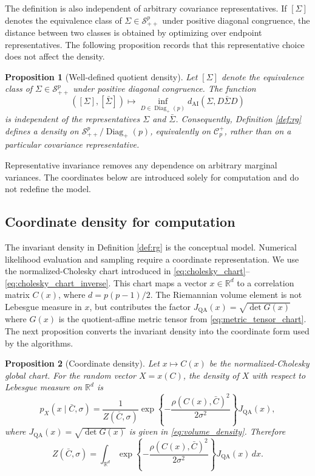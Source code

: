 \documentclass[
  12pt]{article}
\newcommand{\SPD}{\mathcal S_{++}}
\newcommand{\Corr}{\mathcal C^+}
\newcommand{\Diagp}{\operatorname{Diag}_{+}}
\newcommand{\R}{\mathbb R}
\newcommand{\QA}{\mathrm{QA}}
\newcommand{\AI}{\mathrm{AI}}
\newtheorem{proposition}{Proposition}
\begin{document}
The definition is also independent of arbitrary covariance representatives. If $[\Sigma]$ denotes the equivalence class of $\Sigma\in\SPD^p$ under positive diagonal congruence, the distance between two classes is obtained by optimizing over endpoint representatives. The following proposition records that this representative choice does not affect the density.

\begin{proposition}[Well-defined quotient density]\label{prop:well_defined}
Let $[\Sigma]$ denote the equivalence class of $\Sigma\in\SPD^p$ under positive diagonal congruence. The function
\[
([\Sigma],[\bar\Sigma])\mapsto \inf_{D\in\Diagp(p)}d_{\AI}(\Sigma,D\bar\Sigma D)
\]
is independent of the representatives $\Sigma$ and $\bar\Sigma$. Consequently, Definition \ref{def:rg} defines a density on $\SPD^p/\Diagp(p)$, equivalently on $\Corr_p$, rather than on a particular covariance representative.
\end{proposition}

Representative invariance removes any dependence on arbitrary marginal variances. The coordinates below are introduced solely for computation and do not redefine the model.



\subsection{Coordinate density for computation}

The invariant density in Definition \ref{def:rg} is the conceptual model. Numerical likelihood evaluation and sampling require a coordinate representation. We use the normalized-Cholesky chart introduced in \eqref{eq:cholesky_chart}--\eqref{eq:cholesky_chart_inverse}. This chart maps a vector $x\in\R^d$ to a correlation matrix $C(x)$, where $d=p(p-1)/2$. The Riemannian volume element is not Lebesgue measure in $x$, but contributes the factor $J_{\QA}(x)=\sqrt{\det G(x)}$ where $G(x)$ is the quotient-affine metric tensor from \eqref{eq:metric_tensor_chart}. The next proposition converts the invariant density into the coordinate form used by the algorithms.

\begin{proposition}[Coordinate density]\label{prop:coordinate_density}
Let $x\mapsto C(x)$ be the normalized-Cholesky global chart. For the random vector $X=x(C)$, the density of $X$ with respect to Lebesgue measure on $\R^d$ is
\begin{equation}\label{eq:coordinate_density}
p_X(x\mid \bar C,\sigma)=\frac{1}{Z(\bar C,\sigma)}\exp\left\{-\frac{\rho(C(x),\bar C)^2}{2\sigma^2}\right\}J_{\QA}(x),
\end{equation}
where $J_{\QA}(x)=\sqrt{\det G(x)}$ is given in \eqref{eq:volume_density}. Therefore
\begin{equation}\label{eq:chart_integral_Z}
Z(\bar C,\sigma)=\int_{\R^d}\exp\left\{-\frac{\rho(C(x),\bar C)^2}{2\sigma^2}\right\}J_{\QA}(x)\,dx.
\end{equation}
\end{proposition}
\end{document}
